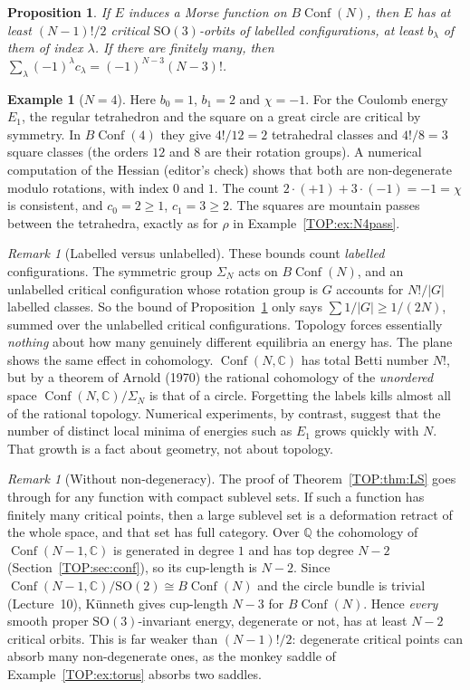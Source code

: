 \documentclass[11pt,openany]{book}
\theoremstyle{plain}
\newtheorem{proposition}[theorem]{Proposition}
\theoremstyle{definition}
\newtheorem{example}[theorem]{Example}
\theoremstyle{remark}
\newtheorem{remark}[theorem]{Remark}
\newcommand{\Q}{\mathbb{Q}}
\newcommand{\C}{\mathbb{C}}
\newcommand{\SO}{\mathrm{SO}}
\newcommand{\Conf}{\operatorname{Conf}}
\newcommand{\abs}[1]{\left\lvert #1 \right\rvert}
\begin{document}
\begin{proposition}\label{TOP:prop:count}
If $E$ induces a Morse function on $B\Conf(N)$, then $E$ has at least $(N-1)!/2$ critical $\SO(3)$-orbits
of labelled configurations, at least $b_\lambda$ of them of index $\lambda$. If there are finitely many,
then $\sum_\lambda(-1)^\lambda c_\lambda=(-1)^{N-3}(N-3)!$.
\end{proposition}

\begin{example}[$N=4$]\label{TOP:ex:N4morse}
Here $b_0=1$, $b_1=2$ and $\chi=-1$. For the Coulomb energy $E_1$, the regular tetrahedron and the square on a
great circle are critical by symmetry. In $B\Conf(4)$ they give $4!/12=2$ tetrahedral classes and
$4!/8=3$ square classes (the orders $12$ and $8$ are their rotation groups). A numerical computation of the
Hessian (editor's check) shows that both are non-degenerate modulo rotations, with index $0$ and $1$. The
count $2\cdot(+1)+3\cdot(-1)=-1=\chi$ is consistent, and $c_0=2\ge1$, $c_1=3\ge2$. The squares are
mountain passes between the tetrahedra, exactly as for $\rho$ in Example~\ref{TOP:ex:N4pass}.
\end{example}

\begin{remark}[Labelled versus unlabelled]
These bounds count \emph{labelled} configurations. The symmetric group $\Sigma_N$ acts on $B\Conf(N)$, and
an unlabelled critical configuration whose rotation group is $G$ accounts for $N!/\abs G$ labelled classes.
So the bound of Proposition~\ref{TOP:prop:count} only says $\sum 1/\abs G\ge 1/(2N)$, summed over the
unlabelled critical configurations. Topology forces essentially \emph{nothing} about how many genuinely
different equilibria an energy has. The plane shows the same effect in cohomology. $\Conf(N,\C)$ has total
Betti number $N!$, but by a theorem of Arnold (1970) the rational cohomology of the \emph{unordered} space
$\Conf(N,\C)/\Sigma_N$ is that of a circle. Forgetting the labels kills almost all of the rational topology.
Numerical experiments, by contrast, suggest that the number of distinct local minima of energies such as
$E_1$ grows quickly with $N$. That growth is a fact about geometry, not about topology.
\end{remark}

\begin{remark}[Without non-degeneracy]
The proof of Theorem~\ref{TOP:thm:LS} goes through for any function with compact sublevel sets. If such a
function has finitely many critical points, then a large sublevel set is a deformation retract of the whole
space, and that set has full category. Over $\Q$ the cohomology of $\Conf(N-1,\C)$ is generated in degree
$1$ and has top degree $N-2$ (Section~\ref{TOP:sec:conf}), so its cup-length is $N-2$. Since
$\Conf(N-1,\C)/\SO(2)\cong B\Conf(N)$ and the circle bundle is trivial (Lecture~10), K\"unneth gives
cup-length $N-3$ for $B\Conf(N)$. Hence \emph{every} smooth proper $\SO(3)$-invariant energy, degenerate or
not, has at least $N-2$ critical orbits. This is far weaker than $(N-1)!/2$: degenerate critical points can
absorb many non-degenerate ones, as the monkey saddle of Example~\ref{TOP:ex:torus} absorbs two saddles.
\end{remark}
\end{document}
